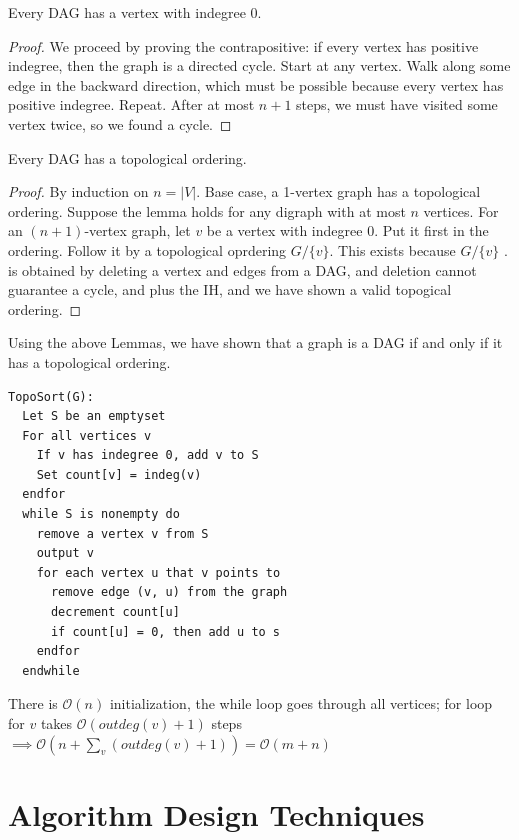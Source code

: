 \documentclass[12pt]{scrartcl}
\begin{document}
\begin{lemma}
  Every DAG has a vertex with indegree $0$. 
  \begin{proof}
    We proceed by proving the contrapositive: if every vertex has positive indegree, then the 
    graph is a directed cycle. Start at any vertex. Walk along some edge in the backward direction, which must be possible because every vertex has positive indegree.
    Repeat. After at most $n+1$ steps, we must have visited some vertex twice, so we found a cycle. 
  \end{proof}
\end{lemma}

\begin{lemma}
  Every DAG has a topological ordering. 
  \begin{proof}
    By induction on $n = |V|$. Base case, a 1-vertex graph has a topological ordering. Suppose the lemma holds for 
    any digraph with at most $n$ vertices. For an $(n+1)$-vertex graph, let $v$ be a vertex with indegree $0$. 
    Put it first in the ordering. Follow it by a topological oprdering $G \slash \{v\}$. This exists 
    because $G \slash \{v\}$ . is obtained by deleting a vertex and edges from a DAG, and deletion cannot 
    guarantee a cycle, and plus the IH, and we have shown a valid topogical ordering. 
  \end{proof}
\end{lemma}

\begin{theorem}
  Using the above Lemmas, we have shown that a graph is a DAG if and only if it has a 
  topological ordering. 
\begin{lstlisting}
TopoSort(G):
  Let S be an emptyset
  For all vertices v
    If v has indegree 0, add v to S
    Set count[v] = indeg(v)
  endfor
  while S is nonempty do
    remove a vertex v from S
    output v
    for each vertex u that v points to 
      remove edge (v, u) from the graph
      decrement count[u]
      if count[u] = 0, then add u to s
    endfor
  endwhile
\end{lstlisting}
There is $\mathcal{O}(n)$ initialization, the while loop goes through all vertices; for loop for $v$ takes 
$\mathcal{O}(outdeg(v) + 1)$ steps $\implies \mathcal{O}(n + \sum_v (outdeg(v) + 1)) = \mathcal{O}(m + n)$
\end{theorem}

\section{Algorithm Design Techniques}
\end{document}
